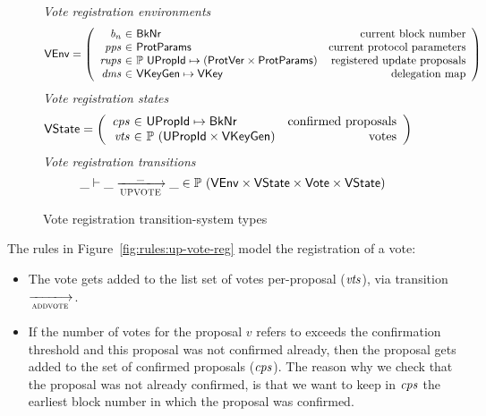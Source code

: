 \begin{figure}[htb]
  \emph{Vote registration environments}
  \begin{align*}
    & \VEnv
      = \left(
      \begin{array}{r@{~\in~}lr}
        \var{b_n} & \BkNr & \text{current block number}\\
        \var{pps} & \ProtParams & \text{current protocol parameters}\\
        \var{rups} & \powerset{\UPropId \mapsto (\ProtVer \times \ProtParams)}
        & \text{registered update proposals}\\
        \var{dms} & \VKeyGen \mapsto \VKey & \text{delegation map}
      \end{array}\right)
  \end{align*}
  \emph{Vote registration states}
  \begin{align*}
    & \VState
      = \left(
      \begin{array}{r@{~\in~}lr}
        \var{cps} & \UPropId \mapsto \BkNr & \text{confirmed proposals}\\
        \var{vts} & \powerset{(\UPropId \times \VKeyGen)} & \text{votes}
      \end{array}\right)
  \end{align*}
  \emph{Vote registration transitions}
    \begin{equation*}
    \_ \vdash \_ \trans{UPVOTE}{\_} \_ \in
    \powerset (\VEnv \times \VState \times \Vote \times \VState)
    \end{equation*}
  \caption{Vote registration transition-system types}
  \label{fig:ts-types:vote-reg}
\end{figure}

The rules in Figure~\ref{fig:rules:up-vote-reg} model the registration of a vote:
\begin{itemize}
\item The vote gets added to the list set of votes per-proposal ($\mathit{vts}$),
  via transition $\trans{addvote}{}$.
\item If the number of votes for the proposal $v$ refers to exceeds the
  confirmation threshold and this proposal was not confirmed already, then the
  proposal gets added to the set of confirmed proposals ($\mathit{cps}$). The
  reason why we check that the proposal was not already confirmed, is that we
  want to keep in $\mathit{cps}$ the earliest block number in which the proposal
  was confirmed.
\end{itemize}

